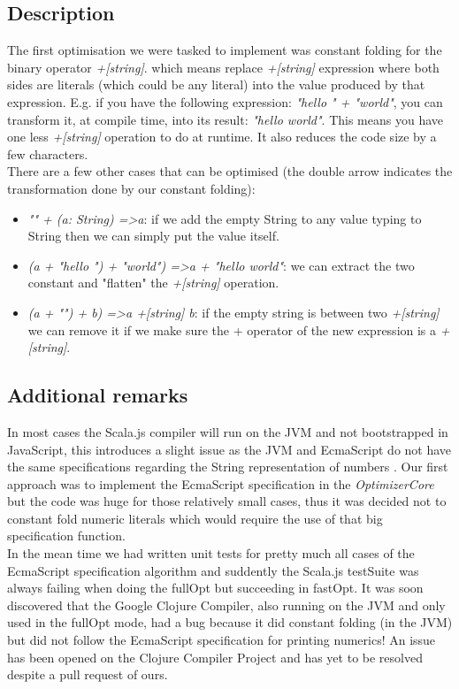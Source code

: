 \subsection{Description}
The first optimisation we were tasked to implement was constant folding for
the binary operator \emph{+[string]}. which means replace \emph{+[string]}
expression where both sides are literals (which could be any literal) into the
value produced by that expression. E.g. if you have the following expression:
\emph{"hello " + "world"}, you can transform it, at compile time, into its
result: \emph{"hello world"}. This means you have one less \emph{+[string]}
operation to do at runtime. It also reduces the code size by a few characters.
\\
There are a few other cases that can be optimised (the double arrow indicates
the transformation done by our constant folding):
\begin{itemize}
  \item \emph{"" + (a: String) =\textgreater a}: if we add the empty String to
any value typing to String then we can simply put the value itself.
  \item \emph{(a + "hello ") + "world") =\textgreater a + "hello world"}: we
can extract the two constant and "flatten" the \emph{+[string]} operation.
  \item \emph{(a + "") + b) =\textgreater a +[string] b}: if the empty string
is between two \emph{+[string]} we can remove it if we make sure the + operator
of the new expression is a \emph{+[string]}.
\end{itemize}


\subsection{Additional remarks}
In most cases the Scala.js compiler will run on the JVM and not bootstrapped in
JavaScript, this introduces a slight issue as the JVM and EcmaScript do not
have the same specifications regarding the String representation of numbers
\cite{ES6}. Our first approach was to implement the EcmaScript specification in
the \emph{OptimizerCore} but the code was huge for those relatively small
cases, thus it was decided not to constant fold numeric literals which would
require the use of that big specification function. \\
In the mean time we had written unit tests for pretty much all cases of the
EcmaScript specification algorithm and suddently the Scala.js testSuite was
always failing when doing the fullOpt but succeeding in fastOpt. It was soon
discovered that the Google Clojure Compiler, also running on the JVM and only
used in the fullOpt mode, had a bug because it did constant folding (in the
JVM) but did not follow the EcmaScript specification for printing numerics!
An issue has been opened on the Clojure Compiler Project and has yet to be
resolved despite a pull request of ours. \cite{googleBug}